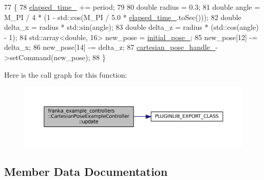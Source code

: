 \begin{DoxyCode}
77                                                                        \{
78   \hyperlink{classfranka__example__controllers_1_1CartesianPoseExampleController_ab671f506567721b65a9607a216cf4a47}{elapsed\_time\_} += period;
79 
80   \textcolor{keywordtype}{double} radius = 0.3;
81   \textcolor{keywordtype}{double} angle = M\_PI / 4 * (1 - std::cos(M\_PI / 5.0 * \hyperlink{classfranka__example__controllers_1_1CartesianPoseExampleController_ab671f506567721b65a9607a216cf4a47}{elapsed\_time\_}.toSec()));
82   \textcolor{keywordtype}{double} delta\_x = radius * std::sin(angle);
83   \textcolor{keywordtype}{double} delta\_z = radius * (std::cos(angle) - 1);
84   std::array<double, 16> new\_pose = \hyperlink{classfranka__example__controllers_1_1CartesianPoseExampleController_a43c4db7364e30dbbb5fa64e6457d639e}{initial\_pose\_};
85   new\_pose[12] -= delta\_x;
86   new\_pose[14] -= delta\_z;
87   \hyperlink{classfranka__example__controllers_1_1CartesianPoseExampleController_a23b7a3e97178593a7ae854f6c513ede7}{cartesian\_pose\_handle\_}->setCommand(new\_pose);
88 \}
\end{DoxyCode}
Here is the call graph for this function\+:
\nopagebreak
\begin{figure}[H]
\begin{center}
\leavevmode
\includegraphics[width=350pt]{classfranka__example__controllers_1_1CartesianPoseExampleController_aaecae953c1aeeaa8d08b569f0ef4723d_cgraph}
\end{center}
\end{figure}


\subsection{Member Data Documentation}
\mbox{\label{classfranka__example__controllers_1_1CartesianPoseExampleController_a23b7a3e97178593a7ae854f6c513ede7}} 
